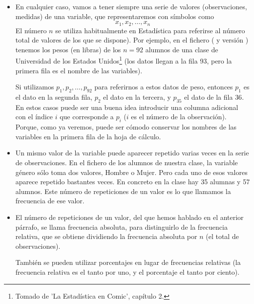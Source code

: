 \begin{itemize}

    \item En cualquier caso, vamos a tener siempre una serie de valores (observaciones, medidas) de una variable, que representaremos con símbolos como
    \[x_1,x_2,\ldots,x_n\]
    El {\sf número $n$} se utiliza habitualmente en Estadística para referirse al {\sf número total de valores} de los que se dispone).
    Por ejemplo, en el fichero 
    ( y versión ) tenemos los pesos (en libras) de los $n=92$ alumnos de una clase de Universidad de los Estados Unidos\footnote{Tomado de 'La Estadística en Comic', capítulo 2.} (los datos llegan a la fila 93, pero la primera fila es el nombre de las variables).

    Si utilizamos $p_1,p_2,\ldots,p_{92}$ para referirnos a estos datos de peso, entonces $p_1$ es el dato en la segunda fila, $p_2$ el dato en la tercera, y $p_{35}$ el dato de la fila $36$. En estos casos puede ser una buena idea introducir una columna adicional con el índice $i$ que corresponde a $p_i$ ($i$ es el número de la observación). Porque, como ya veremos, puede ser cómodo conservar los nombres de las variables en la primera fila de la hoja de cálculo.

    \item Un mismo valor de la variable puede aparecer repetido varias veces en la serie de observaciones. En el fichero de los alumnos de nuestra clase, la variable género sólo toma dos valores, Hombre o Mujer. Pero cada uno de esos valores aparece repetido bastantes veces. En concreto en la clase hay 35 alumnas y 57 alumnos. Este {\sf número de repeticiones de un valor} es lo que llamamos la {\sf frecuencia} de ese valor.

    \item El número de repeticiones de un valor, del que hemos hablado en el anterior párrafo, se llama {\sf frecuencia absoluta}, para distinguirlo de la {\sf frecuencia relativa}, que se obtiene dividiendo la frecuencia absoluta por $n$ (el total de observaciones).

        También se pueden utilizar {\sf porcentajes} en lugar de frecuencias relativas (la frecuencia relativa es el tanto por uno, y el porcentaje el tanto por ciento).


\end{itemize}

